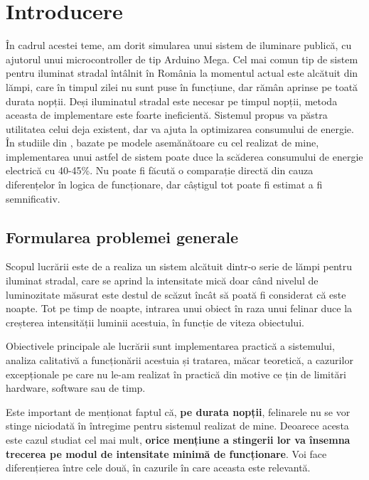 \chapter{Introducere}
\label{chap:introducere}

În cadrul acestei teme, am dorit simularea unui sistem de iluminare publică, cu ajutorul unui microcontroller de tip Arduino Mega. 
Cel mai comun tip de sistem pentru iluminat stradal întâlnit în România la momentul actual este alcătuit din lămpi, care în timpul zilei nu sunt puse în funcțiune, dar rămân aprinse pe toată durata nopții. Deși iluminatul stradal este necesar pe timpul nopții, metoda aceasta de implementare este foarte ineficientă. 
Sistemul propus va păstra utilitatea celui deja existent, dar va ajuta la optimizarea consumului de energie. În studiile din \cite{8539321,7513906}, bazate pe modele asemănătoare cu cel realizat de mine, implementarea unui astfel de sistem poate duce la scăderea consumului de energie electrică cu 40-45\%. Nu poate fi făcută o comparație directă din cauza diferențelor în logica de funcționare, dar câștigul tot poate fi estimat a fi semnificativ.  



\section{Formularea problemei generale}

Scopul lucrării este de a realiza un sistem alcătuit dintr-o serie de lămpi pentru iluminat stradal, care se aprind la intensitate mică doar când nivelul de luminozitate măsurat este destul de scăzut încât să poată fi considerat că este noapte. Tot pe timp de noapte, intrarea unui obiect în raza unui felinar duce la creșterea intensității luminii acestuia, în funcție de viteza obiectului. 

Obiectivele principale ale lucrării sunt implementarea practică a sistemului, analiza calitativă a funcționării acestuia și tratarea, măcar teoretică, a cazurilor excepționale pe care nu le-am realizat în practică din motive ce țin de limitări hardware, software sau de timp.

Este important de menționat faptul că, \textbf{pe durata nopții}, felinarele nu se vor stinge niciodată în întregime pentru sistemul realizat de mine. Deoarece acesta este cazul studiat cel mai mult, \textbf{orice mențiune a stingerii lor va însemna trecerea pe modul de intensitate minimă de funcționare}. Voi face diferențierea între cele două, în cazurile în care aceasta este relevantă.


